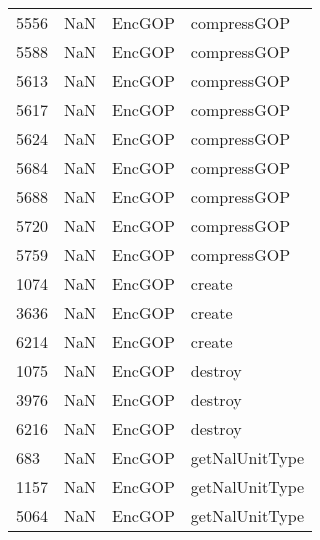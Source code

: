 \begin{tabular}{llll}
5556 &                   NaN &                     EncGOP &                               compressGOP \\
5588 &                   NaN &                     EncGOP &                               compressGOP \\
5613 &                   NaN &                     EncGOP &                               compressGOP \\
5617 &                   NaN &                     EncGOP &                               compressGOP \\
5624 &                   NaN &                     EncGOP &                               compressGOP \\
5684 &                   NaN &                     EncGOP &                               compressGOP \\
5688 &                   NaN &                     EncGOP &                               compressGOP \\
5720 &                   NaN &                     EncGOP &                               compressGOP \\
5759 &                   NaN &                     EncGOP &                               compressGOP \\
1074 &                   NaN &                     EncGOP &                                    create \\
3636 &                   NaN &                     EncGOP &                                    create \\
6214 &                   NaN &                     EncGOP &                                    create \\
1075 &                   NaN &                     EncGOP &                                   destroy \\
3976 &                   NaN &                     EncGOP &                                   destroy \\
6216 &                   NaN &                     EncGOP &                                   destroy \\
683  &                   NaN &                     EncGOP &                            getNalUnitType \\
1157 &                   NaN &                     EncGOP &                            getNalUnitType \\
5064 &                   NaN &                     EncGOP &                            getNalUnitType \\

\end{tabular}
